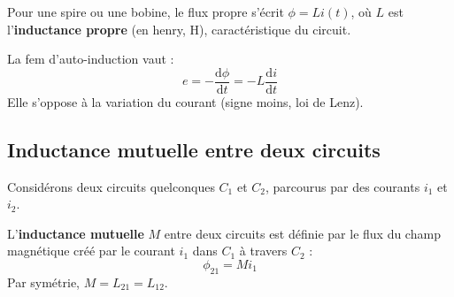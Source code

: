 \documentclass[french]{yLectureNote}
\renewcommand{\vec}{\overrightarrow}
\newcommand{\dd}{\mathrm{d}}
\begin{document}
\begin{theorem}
    Pour une spire ou une bobine, le flux propre s'écrit $\phi = L i(t)$, où $L$ est l'\textbf{inductance propre} (en henry, H), caractéristique du circuit.
\end{theorem}

\begin{theorem}
    La fem d'auto-induction vaut :
    $$e = -\frac{\dd \phi}{\dd t} = -L \frac{\dd i}{\dd t}$$
    Elle s'oppose à la variation du courant (signe moins, loi de Lenz).
\end{theorem}
\subsection{Inductance mutuelle entre deux circuits}
Considérons deux circuits quelconques $C_1$ et $C_2$, parcourus par des courants $i_1$ et $i_2$.

\begin{definition}
    L'\textbf{inductance mutuelle} $M$ entre deux circuits est définie par le flux du champ magnétique créé par le courant $i_1$ dans $C_1$ à travers $C_2$ :
    $$
    \phi_{21} = M i_1
    $$
    Par symétrie, $M = L_{21} = L_{12}$.
\end{definition}






\end{document}
